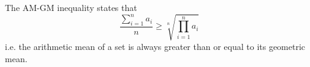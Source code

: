 The AM-GM inequality states that
\[ 
\frac{\sum _{i=1}^{n} a_{i}}{n}
\geq 
\sqrt[n]{\prod_{i=1}^{n} a_{i}}
\]
i.e. the arithmetic mean of a set is always greater than or equal to its geometric mean.